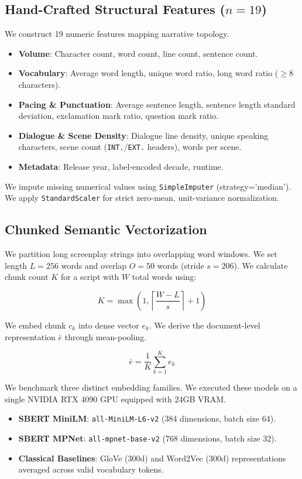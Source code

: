 \documentclass[conference]{IEEEtran}
\begin{document}
\subsection{Hand-Crafted Structural Features ($n = 19$)}
We construct 19 numeric features mapping narrative topology.
\begin{itemize}
\item \textbf{Volume}: Character count, word count, line count, sentence count.
\item \textbf{Vocabulary}: Average word length, unique word ratio, long word ratio ($\ge 8$ characters).
\item \textbf{Pacing \& Punctuation}: Average sentence length, sentence length standard deviation, exclamation mark ratio, question mark ratio.
\item \textbf{Dialogue \& Scene Density}: Dialogue line density, unique speaking characters, scene count (\texttt{INT.}/\texttt{EXT.} headers), words per scene.
\item \textbf{Metadata}: Release year, label-encoded decade, runtime.
\end{itemize}

We impute missing numerical values using \texttt{SimpleImputer} (strategy='median'). We apply \texttt{StandardScaler} for strict zero-mean, unit-variance normalization.

\subsection{Chunked Semantic Vectorization}
We partition long screenplay strings into overlapping word windows. We set length $L = 256$ words and overlap $O = 50$ words (stride $s = 206$). We calculate chunk count $K$ for a script with $W$ total words using:

\begin{equation}
K = \max\left(1, \left\lceil \frac{W - L}{s} \right\rceil + 1\right)
\end{equation}

We embed chunk $c_k$ into dense vector $e_k$. We derive the document-level representation $\bar{e}$ through mean-pooling.

\begin{equation}
\bar{e} = \frac{1}{K} \sum_{k=1}^{K} e_k
\end{equation}

We benchmark three distinct embedding families. We executed these models on a single NVIDIA RTX 4090 GPU equipped with 24GB VRAM. 
\begin{itemize}
\item \textbf{SBERT MiniLM}: \texttt{all-MiniLM-L6-v2} (384 dimensions, batch size 64).
\item \textbf{SBERT MPNet}: \texttt{all-mpnet-base-v2} (768 dimensions, batch size 32).
\item \textbf{Classical Baselines}: GloVe (300d) and Word2Vec (300d) representations averaged across valid vocabulary tokens.
\end{itemize}
\end{document}
